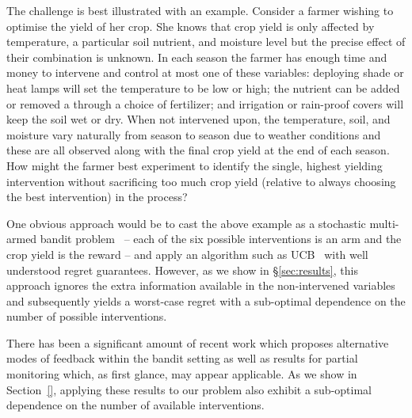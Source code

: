 \documentclass{article}
\makeatletter
\newcommand{\tinytodo}[2][]{\todo[size=\tiny]{#2}}
\newcommand{\todom}[2][]{\tinytodo[color=green!20, #1]{M:\@#2}} %
\theoremstyle{plain}
\theoremstyle{definition}
\makeatother
\begin{document}
The challenge is best illustrated with an example. Consider a farmer wishing to optimise the yield of her crop. 
She knows that crop yield is only affected by temperature, a particular soil nutrient, and moisture level but the precise effect of their combination is unknown.
In each season the farmer has enough time and money to intervene and control at most one of these variables:
deploying shade or heat lamps will set the temperature to be low or high; the nutrient can be added or removed a through a choice of fertilizer; and irrigation or rain-proof covers will keep the soil wet or dry.
When not intervened upon, the temperature, soil, and moisture vary naturally from season to season due to weather conditions and these are all observed along with the final crop yield at the end of each season.
How might the farmer best experiment to identify the single, highest yielding intervention without sacrificing too much crop yield (relative to always choosing the best intervention) in the process?

One obvious approach would be to cast the above example as a stochastic multi-armed bandit problem~\cite{Robbins1952} -- each of the six possible interventions is an arm and the crop yield is the reward -- and apply an algorithm such as UCB~\cite{Auer1995} with well understood regret guarantees.
However, as we show in \S\ref{sec:results}, this approach ignores the extra information available in the non-intervened variables and subsequently yields a worst-case regret with a sub-optimal dependence on the number of possible interventions.

There has been a significant amount of recent work which proposes alternative modes of feedback within the bandit setting \cite{TODO} as well as results for partial monitoring which, as first glance, may appear applicable. As we show in Section~\ref{}, applying these results to our problem also exhibit a sub-optimal dependence on the number of available interventions.

\todom{Rework rest of intro}


\end{document}
